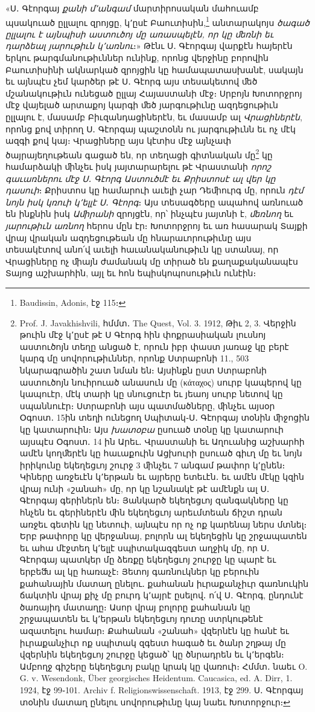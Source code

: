\documentclass{article}
\begin{document}
{«Ս․ Գէորգայ \emph{քանի մ՚անգամ} մարտիրոսական մահուամբ պսակուած ըլլալու զրոյցը, կ՚ըսէ Բաուտիսին,\footnote{Baudissin, Adonis, էջ 115։} անտարակոյս \emph{ծագած ըլլալու է այնպիսի աստուծոյ մը առասպելէն, որ կը ﬔռնի եւ դարձեալ յարութիւն կ՚առնու}։» Թէնւ Ս․ Գէորգայ վարքէն հայերէն երկու թարգմանութիւններ ունինք, որոնց վերջինը բորովին Բաուտիսինի ակնարկած զրոյցին կը համապատասխանէ, սակայն եւ այնպէս չեմ կարծեր թէ Ս․ Գէորգ այս տեսակետով ﬔծ մշանակութիւն ունեցած ըլլայ Հայաստանի մէջ։ Սրբոյն Խոտորջրոյ մէջ վայելած արտաքոյ կարգի ﬔծ յարգութիւնը ազդեցութիւն ըլլալու է, մասամբ Բիւզանդացիներէն, եւ մասամբ ալ \emph{Վրացիներէն}, որոնց քով տիրող Ս․ Գէորգայ պաշտօնն ու յարգութիւնն եւ ոչ մէկ ազգի քով կայ։ Վրացիները այս կէտիս մէջ այնչափ ծայրայեղութեան գացած են, որ տեղացի գիտնական մը\footnote{Prof. J. Javakhishvili, հմմտ․ The Quest, Vol. 3. 1912, Թիւ 2, 3. Վերջին թուին մէջ կ՚ըսէ թէ Ս Գէորգ հին փոքրասիական լուսնոյ աստուծոյն տեղը անցած է, որուն իբր փաստ յառաջ կը բերէ կարգ մը սովորութիւններ, որոնք Ստրաբոնի 11., 503 նկարագրածին շատ նման են։ Այսինքն ըստ Ստրաբոնի աստուծոյն նուիրուած անասուն մը (κάταχος) սուրբ կապերով կը կապուէր, մէկ տարի կը սնուցուէր եւ յեաոյ սուրբ նետով կը սպաննուէր։ Ստրաբոնի այս պատմածները, ﬕնչեւ այսօր Օգոստ․ 15ին տեղի ունեցող Սպիտակ֊Ս․ Գէորգայ տօնին ﬕջոցին կը կատարուին։ Այս \emph{խատօբա} ըսուած տօնը կը կատարուի այսպէս Օգոստ․ 14 ին Արեւ․ Վրաստանի եւ Աղուանից աշխարհի ամէն կողﬔրէն կը հաւաքուին Ացխուրի ըսուած գիւղ մը եւ նոյն իրիկունը եկեղեցւոյ շուրջ 3 ﬕնչեւ 7 անգամ թափոր կ՚ընեն։ Կիները առջեւէն կ՚երթան եւ այրերը ետեւէն․ եւ ամէն մէկը կզին վրայ ունի «շանահ» մը, որ կը նշանակէ թէ ամէնքն ալ Ս․ Գէորգայ գերիներն են։ Յանկարծ եկեղեցւոյ զանգակները կը հնչեն եւ գերիներէն ﬕն եկեղեցւոյ արեւմտեան ճիշտ դրան առջեւ գետին կը նետուի, այնպէս որ ոչ ոք կարենայ ներս մտնել։ Երբ թափորը կը վերջանայ, բոլորն ալ եկեղեցին կը շրջապատեն եւ ահա մէջտեղ կ՚ելլէ սպիտակազգեստ աղջիկ մը, որ Ս․ Գէորգայ պատկեր մը ձեռքը եկեղեցւոյ շուրջը կը պարէ եւ երբեﬓ ալ կը հառաչէ։ Յետոյ գառնուկներ կը բերուին քահանային մատաղ ընելու․ քահանան իւրաքանչիւր գառնուկին ճակտին վրայ քիչ մը բուրդ կ՚այրէ ըսելով․ ո՛վ Ս․ Գէորգ, ընդունէ ծառայիդ մատաղը։ Ասոր վրայ բոլորը քահանան կը շրջապատեն եւ կ՚երթան եկեղեցւոյ դուռը ստրկութենէ ազատելու համար։ Քահանան «շանահ» վզերնէն կը հանէ եւ իւրաքանչիւր ոք սպիտակ զգեստ հագած եւ ծանր շղթայ մը վզերնին եկեղեցւոյ շուրջը կեցած՝ կը ծնրադրեն եւ կ՚երգեն։ Ամբողջ գիշերը եկեղեցւոյ բակը կրակ կը վառուի։ Հմմտ․ նաեւ O. G. v. Wesendonk, Über georgisches Heidentum. Caucasica, ed. A. Dirr, 1. 1924, էջ 99֊101. Archiv f. Religionswissenschaft. 1913, էջ 299. Ս․ Գէորգայ տօնին մատաղ ընելու սովորութիւնը կայ նաեւ Խոտորջուր։} կը համարձակի ﬕնչեւ իսկ յայտարարելու թէ Վրաստանի \emph{որոշ գաւառներու մէջ Ս․ Գէորգ Աստուծմէ եւ Քրիստոսէ ալ վեր կը դասուի}։ Քրիստոս կը համարուի աւելի չար Դեﬕուրգ մը, որուն \emph{դէմ նոյն իսկ կռուի կ՚ելլէ Ս․ Գէորգ}։ Այս տեսագծերը ապահով առնուած են ինքնին իսկ \emph{Աﬕրանի} զրոյցէն, որ՝ ինչպէս յայտնի է, \emph{ﬔռնող} եւ \emph{յարութիւն առնող} հերոս մըն էր։ Խոտորջրոյ եւ առ հասարակ Տայքի վրայ վրական ազդեցութեան մը հնարաւորութիւնը այս տեսակէտով անո՛վ աւելի հաւանականութիւն կը ստանայ, որ Վրացիները ոչ ﬕայն ժամանակ մը տիրած են քաղաքականապէս Տայոց աշխարհին, այլ եւ հոն եպիսկոպոսութիւն ունէին։

}
\end{document}
